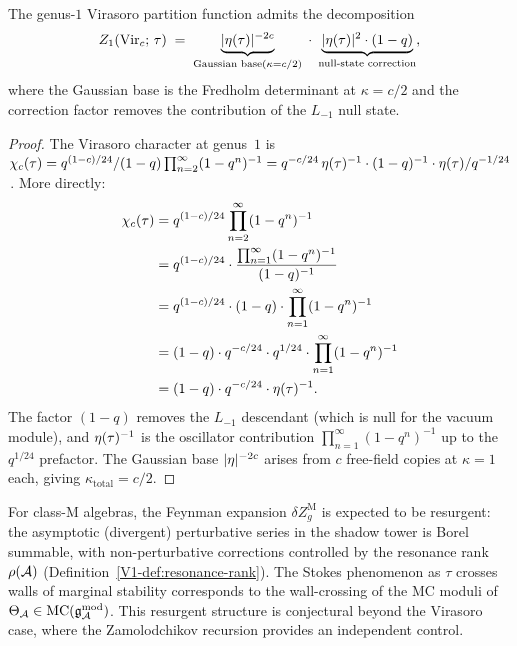 \begin{proposition}%
%
The genus-$1$ Virasoro partition function admits the decomposition
\begin{equation}%
Z_1(\mathrm{Vir}_c;\,\tau)
\;=\;
\underbrace{|\dedeta(\tau)|^{-2c}}_{\text{Gaussian base}
(\kappa = c/2)}
\;\cdot\;
\underbrace{|\dedeta(\tau)|^{2}
\cdot (1-q)}_{\text{null-state correction}},
\end{equation}
where the Gaussian base is the Fredholm determinant at
$\kappa = c/2$ and the correction factor removes the
contribution of the $L_{-1}$ null state.
\end{proposition}

\begin{proof}
The Virasoro character at genus~$1$ is
$\chi_c(\tau) = q^{(1-c)/24}/(1-q)\prod_{n=2}^{\infty}(1-q^n)^{-1}
= q^{-c/24}\,\eta(\tau)^{-1}\cdot(1-q)^{-1}\cdot\eta(\tau)/q^{-1/24}$\,.
More directly:
\begin{align}
\chi_c(\tau)
&= q^{(1-c)/24} \prod_{n=2}^{\infty}(1-q^n)^{-1}
\notag\\
&= q^{(1-c)/24}
\cdot \frac{\prod_{n=1}^{\infty}(1-q^n)^{-1}}{(1-q)^{-1}}
\notag\\
&= q^{(1-c)/24}
\cdot (1-q) \cdot \prod_{n=1}^{\infty}(1-q^n)^{-1}
\notag\\
&= (1-q)\cdot q^{-c/24}\cdot q^{1/24}
\cdot \prod_{n=1}^{\infty}(1-q^n)^{-1}
\notag\\
&= (1-q)\cdot q^{-c/24}\cdot \eta(\tau)^{-1}.
\end{align}
The factor $(1-q)$ removes the $L_{-1}$ descendant (which is
null for the vacuum module), and $\eta(\tau)^{-1}$ is the
oscillator contribution $\prod_{n=1}^{\infty}(1-q^n)^{-1}$
up to the $q^{1/24}$ prefactor. The Gaussian base
$|\eta|^{-2c}$ arises from $c$ free-field copies at
$\kappa = 1$ each, giving $\kappa_{\mathrm{total}} = c/2$.
\end{proof}

\begin{remark}%
%
For class-M algebras, the Feynman expansion
$\delta Z_g^{\mathrm{M}}$ is expected to be resurgent:
the asymptotic (divergent) perturbative series in the shadow
tower is Borel summable, with non-perturbative corrections
controlled by the resonance rank $\rho(\mathcal{A})$
(Definition~\ref{V1-def:resonance-rank}). The Stokes phenomenon
as $\tau$ crosses walls of marginal stability corresponds to
the wall-crossing of the MC moduli of
$\Theta_{\mathcal{A}} \in \mathrm{MC}(\mathfrak{g}_{\mathcal{A}}^{\mathrm{mod}})$. This resurgent structure is
conjectural beyond the Virasoro case, where the Zamolodchikov
recursion provides an independent control.
\end{remark}

